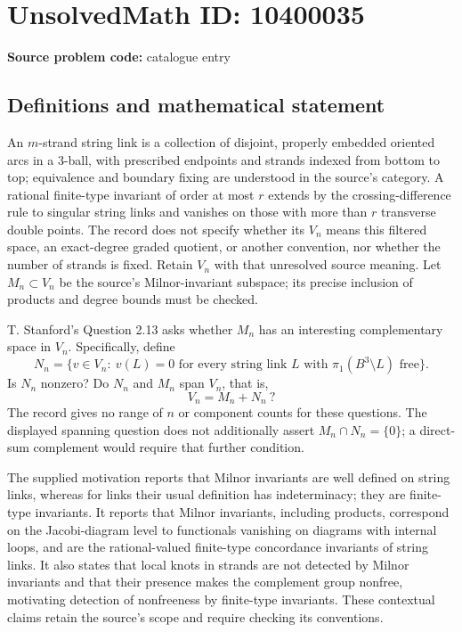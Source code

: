 \documentclass[11pt]{article}
\begin{document}
\section*{UnsolvedMath ID: 10400035}
\textbf{Source problem code:} catalogue entry
\subsection{Definitions and mathematical statement}
An \(m\)-strand string link is a collection of disjoint, properly embedded oriented arcs in a \(3\)-ball, with prescribed endpoints and strands indexed from bottom to top; equivalence and boundary fixing are understood in the source's category. A rational finite-type invariant of order at most \(r\) extends by the crossing-difference rule to singular string links and vanishes on those with more than \(r\) transverse double points. The record does not specify whether its \(V_n\) means this filtered space, an exact-degree graded quotient, or another convention, nor whether the number of strands is fixed. Retain \(V_n\) with that unresolved source meaning. Let \(M_n\subset V_n\) be the source's Milnor-invariant subspace; its precise inclusion of products and degree bounds must be checked.

T. Stanford's Question 2.13 asks whether \(M_n\) has an interesting complementary space in \(V_n\). Specifically, define
\[
 N_n=\{v\in V_n:\ v(L)=0\text{ for every string link }L
       \text{ with }\pi_1(B^3\setminus L)\text{ free}\}.
\]
Is \(N_n\) nonzero? Do \(N_n\) and \(M_n\) span \(V_n\), that is,
\[
 V_n=M_n+N_n\ ?
\]
The record gives no range of \(n\) or component counts for these questions. The displayed spanning question does not additionally assert \(M_n\cap N_n=\{0\}\); a direct-sum complement would require that further condition.

The supplied motivation reports that Milnor invariants are well defined on string links, whereas for links their usual definition has indeterminacy; they are finite-type invariants. It reports that Milnor invariants, including products, correspond on the Jacobi-diagram level to functionals vanishing on diagrams with internal loops, and are the rational-valued finite-type concordance invariants of string links. It also states that local knots in strands are not detected by Milnor invariants and that their presence makes the complement group nonfree, motivating detection of nonfreeness by finite-type invariants. These contextual claims retain the source's scope and require checking its conventions.
\end{document}
